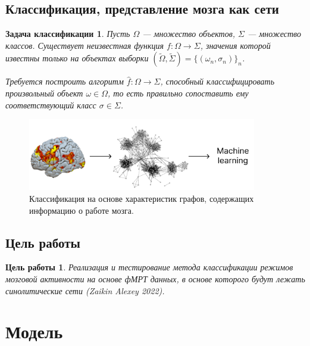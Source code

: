 \documentclass{beamer}
\newtheorem*{classification*}{Задача классификации}
\newtheorem*{purpose*}{Цель работы}
\begin{document}
		\subsection{Классификация, представление мозга как сети}
			\begin{frame}
				\begin{classification*}
					Пусть $\Omega$ --- множество объектов, $\Sigma$ --- множество классов. Существует неизвестная функция $f: \Omega \rightarrow \Sigma$, значения которой известны только на объектах выборки $(\widetilde{\Omega}, \widetilde{\Sigma}) =  \{(\omega_{n}, \sigma_{n})\}_n$. 
					\vspace{0.35cm}
					
					Требуется построить алгоритм $\widehat{f}: \Omega \rightarrow \Sigma$, способный классифицировать произвольный объект $\omega \in \Omega$, то есть правильно сопоставить ему соответствующий класс $\sigma \in \Sigma$.
				\end{classification*}
					
				\begin{figure}
					\includegraphics[width=10cm]{../images/fmri_graph_ml_1.pdf}
					\caption{Классификация на основе характеристик графов, содержащих информацию о работе мозга.} 
					\label{fg:3}
				\end{figure}						
			\end{frame}
		
		\subsection{Цель работы}
			\begin{frame}		
				\begin{purpose*}
					Реализация и тестирование метода классификации режимов мозговой активности на основе фМРТ данных, в основе которого будут лежать синолитические сети (Zaikin Alexey 2022).
				\end{purpose*}
			\end{frame}
		
	\section{Модель}
\end{document}
